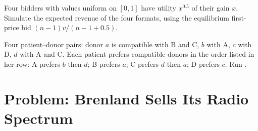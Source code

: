 \begin{exercise}[$\star\star\star$]\label{exo:b3:auctions-and-market-design:11}
Four bidders with values uniform on $[0, 1]$ have utility $x^{0.5}$ of their gain $x$. Simulate the expected
revenue of the four formats, using the equilibrium first-price bid $(n - 1)v/(n - 1 + 0.5)$.
\end{exercise}

\begin{exercise}[$\star\star\star$]\label{exo:b3:auctions-and-market-design:12}
Four patient--donor pairs: donor $a$ is compatible with B and C, $b$ with A, $c$ with D, $d$ with A and C.
Each patient prefers compatible donors in the order listed in her row: A prefers $b$ then $d$;
B prefers $a$; C prefers $d$ then $a$; D prefers $c$. Run .
\end{exercise}

\section{Problem: Brenland Sells Its Radio Spectrum}\label{sec:b3:auctions-and-market-design:problem}

